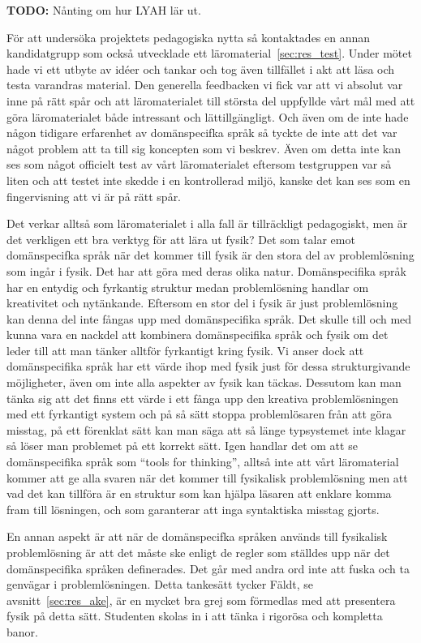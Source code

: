 \begin{draft}
\textbf{TODO:} Nånting om hur LYAH lär ut.

För att undersöka projektets pedagogiska nytta så kontaktades en annan
kandidatgrupp som också utvecklade ett läromaterial~\ref{sec:res_test}. Under
mötet hade vi ett utbyte av idéer och tankar och tog även tillfället i akt att
läsa och testa varandras material. Den generella feedbacken vi fick var att vi
absolut var inne på rätt spår och att läromaterialet till största del uppfyllde
vårt mål med att göra läromaterialet både intressant och lättillgängligt. Och
även om de inte hade någon tidigare erfarenhet av domänspecifka språk så tyckte
de inte att det var något problem att ta till sig koncepten som vi beskrev. Även
om detta inte kan ses som något officielt test av vårt läromaterialet eftersom
testgruppen var så liten och att testet inte skedde i en kontrollerad miljö,
kanske det kan ses som en fingervisning att vi är på rätt spår.

Det verkar alltså som läromaterialet i alla fall är tillräckligt pedagogiskt,
men är det verkligen ett bra verktyg för att lära ut fysik? Det som talar emot
domänspecifka språk när det kommer till fysik är den stora del av problemlösning
som ingår i fysik. Det har att göra med deras olika natur. Domänspecifika språk
har en entydig och fyrkantig struktur medan problemlösning handlar om
kreativitet och nytänkande. Eftersom en stor del i fysik är just problemlösning
kan denna del inte fångas upp med domänspecifika språk. Det skulle till och med
kunna vara en nackdel att kombinera domänspecifika språk och fysik om det leder
till att man tänker alltför fyrkantigt kring fysik. Vi anser dock att
domänspecifika språk har ett värde ihop med fysik just för dessa strukturgivande
möjligheter, även om inte alla aspekter av fysik kan täckas.  Dessutom kan man
tänka sig att det finns ett värde i ett fånga upp den kreativa problemlösningen
med ett fyrkantigt system och på så sätt stoppa problemlösaren från att göra
misstag, på ett förenklat sätt kan man säga att så länge typsystemet inte klagar
så löser man problemet på ett korrekt sätt. Igen handlar det om att se
domänspecifika språk som ``tools for thinking'', alltså inte att vårt
läromaterial kommer att ge alla svaren när det kommer till fysikalisk
problemlösning men att vad det kan tillföra är en struktur som kan hjälpa
läsaren att enklare komma fram till lösningen, och som garanterar att inga
syntaktiska misstag gjorts.

En annan aspekt är att när de domänspecifka språken används till fysikalisk
problemlösning är att det måste ske enligt de regler som ställdes upp när det
domänspecifika språken definerades. Det går med andra ord inte att fuska och ta
genvägar i problemlösningen. Detta tankesätt tycker Fäldt, se
avsnitt~\ref{sec:res_ake}, är en mycket bra grej som förmedlas med att
presentera fysik på detta sätt. Studenten skolas in i att tänka i rigorösa och
kompletta banor.


\end{draft}
